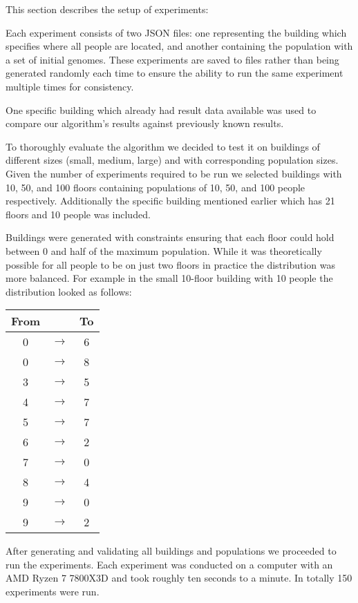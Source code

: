 This section describes the setup of experiments:

Each experiment consists of two JSON files: one representing the building which specifies where all people are located, and another containing the population with a set of initial genomes.
These experiments are saved to files rather than being generated randomly each time to ensure the ability to run the same experiment multiple times for consistency.

One specific building which already had result data available was used to compare our algorithm's results against previously known results. 

To thoroughly evaluate the algorithm we decided to test it on buildings of different sizes (small, medium, large) and with corresponding population sizes.
Given the number of experiments required to be run we selected buildings with 10, 50, and 100 floors containing populations of 10, 50, and 100 people respectively. Additionally the specific building mentioned earlier which has 21 floors and 10 people was included.

Buildings were generated with constraints ensuring that each floor could hold between 0 and half of the maximum population.
While it was theoretically possible for all people to be on just two floors in practice the distribution was more balanced. For example in the small 10-floor building with 10 people the distribution looked as follows:

\begin{center}
\begin{tabular}{c c c}
    \textbf{From} &  & \textbf{To} \\
    \hline
    0 & $\to$ & 6 \\
    0 & $\to$ & 8 \\
    3 & $\to$ & 5 \\
	4 & $\to$ & 7 \\
	5 & $\to$ & 7 \\
	6 & $\to$ & 2 \\
	7 & $\to$ & 0 \\
	8 & $\to$ & 4 \\
	9 & $\to$ & 0 \\
	9 & $\to$ & 2 \\
\end{tabular}
\end{center}

After generating and validating all buildings and populations we proceeded to run the experiments. Each experiment was conducted on a computer with an AMD Ryzen 7 7800X3D and took roughly ten seconds to a minute. In totally 150 experiments were run.


